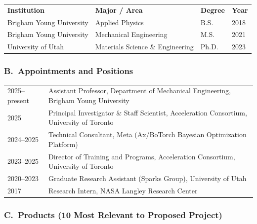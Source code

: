 \documentclass[11pt,letterpaper]{article}
\begin{document}
\begin{tabular}{@{}llll@{}}
\textbf{Institution} & \textbf{Major / Area} & \textbf{Degree} & \textbf{Year} \\[2pt]
Brigham Young University & Applied Physics & B.S. & 2018 \\
Brigham Young University & Mechanical Engineering & M.S. & 2021 \\
University of Utah & Materials Science \& Engineering & Ph.D. & 2023 \\
\end{tabular}

\subsubsection*{B.\ Appointments and Positions}

\begin{tabular}{@{}lp{8cm}@{}}
2025--present & Assistant Professor, Department of Mechanical Engineering,
                Brigham Young University \\[2pt]
2025          & Principal Investigator \& Staff Scientist,
                Acceleration Consortium, University of Toronto \\[2pt]
2024--2025    & Technical Consultant, Meta (Ax/BoTorch Bayesian
                Optimization Platform) \\[2pt]
2023--2025    & Director of Training and Programs,
                Acceleration Consortium, University of Toronto \\[2pt]
2020--2023    & Graduate Research Assistant (Sparks Group),
                University of Utah \\[2pt]
2017          & Research Intern, NASA Langley Research Center \\
\end{tabular}

\subsubsection*{C.\ Products (10 Most Relevant to Proposed Project)}
\end{document}
